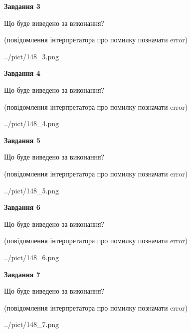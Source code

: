 \documentclass[12pt, ukrainian]{article}
\begin{document}
{\begin {large}
{\begin {center}\textbf{Завдання 3}\end {center}}\par
Що буде виведено за виконання?\par
 (повідомлення інтерпретатора про помилку позначати error)\par
\begin{center}
	{../pict/148_3.png}
\end{center}
\newpage

{\begin {center}\textbf{Завдання 4}\end {center}}\par
Що буде виведено за виконання?\par
 (повідомлення інтерпретатора про помилку позначати error)\par
\begin{center}
	{../pict/148_4.png}
\end{center}
\newpage

{\begin {center}\textbf{Завдання 5}\end {center}}\par
Що буде виведено за виконання?\par
 (повідомлення інтерпретатора про помилку позначати error)\par
\begin{center}
	{../pict/148_5.png}
\end{center}
\newpage

{\begin {center}\textbf{Завдання 6}\end {center}}\par
Що буде виведено за виконання?\par
 (повідомлення інтерпретатора про помилку позначати error)\par
\begin{center}
	{../pict/148_6.png}
\end{center}
\newpage

{\begin {center}\textbf{Завдання 7}\end {center}}\par
Що буде виведено за виконання?\par
 (повідомлення інтерпретатора про помилку позначати error)\par
\begin{center}
	{../pict/148_7.png}
\end{center}
\newpage


\end{large}}
\end{document}
